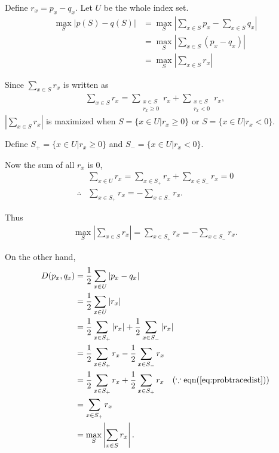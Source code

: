 Define $r_x = p_x - q_x$. Let $U$ be the whole index set.
\begin{align*}
	\max_S |p(S) - q(S)| &= \max_S \left|\sum_{x \in S} p_x - \sum_{x \in S} q_x \right|\\
		&= \max_S \left|\sum_{x \in S} (p_x -  q_x) \right|\\
		&= \max_S \left|\sum_{x \in S} r_x \right|
\end{align*}


Since $\sum_{x \in S} r_x $ is written as
\begin{align}
	\sum_{x \in S} r_x = \sum_{\substack{x \in S\\  r_x \geq 0}} r_x + \sum_{\substack{x \in S\\ r_x < 0}} r_x,\label{eq:subsettracedist}
\end{align}
$\left|\sum_{x \in S} r_x \right|$ is maximized when $S = \{x \in U | r_x \geq 0  \}$ or $S = \{x \in U | r_x < 0  \}$.

Define $S_+ = \{x \in U | r_x \geq 0  \}$ and $S_- = \{x \in U | r_x < 0  \}$.

Now the sum of all $r_x$ is 0,
\begin{align*}
	&\sum_{x \in U} r_x = \sum_{x \in S_+} r_x + \sum_{x \in S_-} r_x = 0\\
	\therefore &\sum_{x \in S_+} r_x = - \sum_{x \in S_-} r_x.
\end{align*}

Thus
\begin{align}
	\max_S \left|\sum_{x \in S} r_x \right| = \sum_{x \in S_+} r_x = - \sum_{x \in S_-} r_x \label{eq:probtracedist}.
\end{align}

On the other hand,
\begin{align}
	D(p_x, q_x) &= \frac{1}{2} \sum_{x \in U} |p_x - q_x|\nonumber\\
		&= \frac{1}{2} \sum_{x \in U} |r_x|\nonumber\\
		&= \frac{1}{2} \sum_{x \in S_+} |r_x| + \frac{1}{2} \sum_{x \in S_-} |r_x|\nonumber\\
		&= \frac{1}{2} \sum_{x \in S_+} r_x - \frac{1}{2} \sum_{x \in S_-} r_x\nonumber\\
		&= \frac{1}{2} \sum_{x \in S_+} r_x + \frac{1}{2} \sum_{x \in S_+} r_x ~~~(\because \text{eqn} (\ref{eq:probtracedist}))\nonumber\\
		&= \sum_{x \in S_+} r_x \nonumber\\
		&= \max_S \left|\sum_{x \in S} r_x \right|.\nonumber
\end{align}

